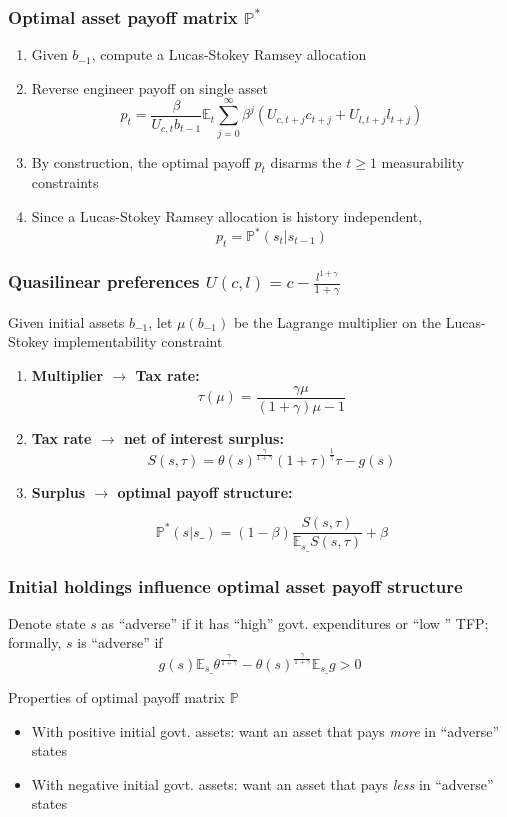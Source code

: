 \documentclass{beamer}
\newcommand{\EE}{\mathbb E}
\begin{document}
  \begin{frame}
\frametitle{Optimal asset payoff matrix $\mathbb{P}^*$}
\begin{enumerate}
 \item  Given $b_{-1}$, compute a Lucas-Stokey Ramsey allocation


 \item Reverse engineer  payoff on single asset
\[
	p_t = \frac{\beta}{U_{c,t}b_{t-1}}\EE_t\sum_{j=0}^\infty\beta^j\left(U_{c,t+j}c_{t+j}+U_{l,t+j}l_{t+j}\right)
\]
\item By construction, the optimal payoff  $p_t$   disarms the  $t\geq 1$
measurability constraints
\item Since a Lucas-Stokey Ramsey allocation is  history independent,
\[p_t=\mathbb{P}^*(s_t|s_{t-1})\]
\end{enumerate}
\end{frame}
%
\begin{frame}
\frametitle{Quasilinear preferences $U(c,l)=c-\frac{l^{1+\gamma}}{1+\gamma}$}
Given
 initial assets $b_{-1}$,  let $\mu(b_{-1})$ be the Lagrange multiplier on the Lucas-Stokey implementability constraint
\begin{enumerate}

 \item \textbf{Multiplier $\to$ Tax rate:}
 \[
		\tau(\mu) = \frac{\gamma\mu}{(1+\gamma)\mu-1}
	\]
 \item \textbf{Tax rate $\to$ net of interest surplus:}
 \[
		S(s,\tau) = \theta(s)^\frac\gamma{1+\gamma}(1+\tau)^\frac1\gamma\tau-g(s)
	\]
\item \textbf{Surplus $\to$ optimal payoff structure:}

\[
 \mathbb{P}^*(s|s\_) = (1-\beta)\frac{S(s,\tau)}{\EE_{s\_} S(s,\tau)} + \beta
 \]

 \end{enumerate}

\end{frame}

%
% 		
\begin{frame}		
   \frametitle{Initial holdings influence optimal asset payoff structure}
Denote state $s$ as ``adverse''  if it has ``high'' govt. expenditures or ``low '' TFP; formally, $s$ is ``adverse'' if
\[   g(s)\EE_{s\_}\theta^\frac{\gamma}{1+\gamma}-\theta(s)^\frac\gamma{1+\gamma}\EE_{s\_} g >0\]

Properties of  optimal payoff matrix $\mathbb{P}$

\begin{itemize}
 \item With positive initial govt. assets: want an asset  that pays {\em more} in ``adverse'' states
 \item With negative initial govt. assets: want an asset  that pays {\em less} in ``adverse'' states
\end{itemize}
\end{frame}
\end{document}
